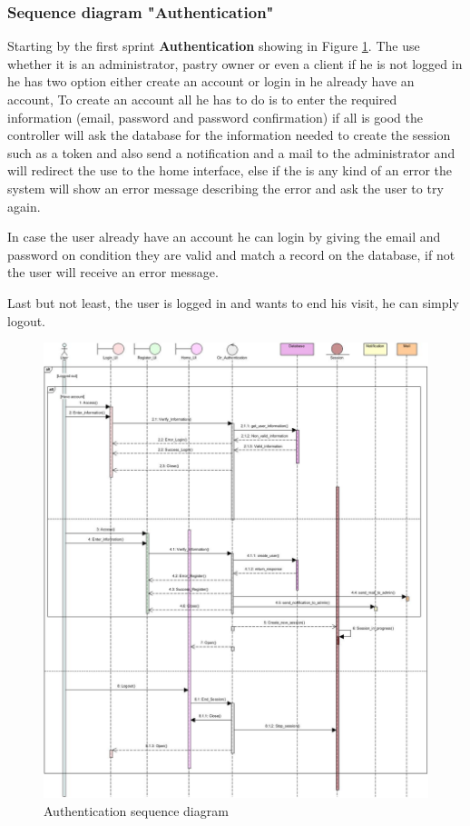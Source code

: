\documentclass[12pt,a4paper]{report}
\begin{document}
\subsubsection*{Sequence diagram "Authentication"}
Starting by the first sprint \textbf{Authentication} showing in Figure \ref{auth-sequence}. The use whether it is an administrator, pastry owner or even a client if he is not logged in he has two option either create an account or login in he already have an account, To create an account all he has to do is to enter the required information (email, password and password confirmation) if all is good the controller will ask the database for the information needed to create the session such as a token and also send a notification and a mail to the administrator and will redirect the use to the home interface, else if the is any kind of an error the system will show an error message describing the error and ask the user to try again.\par 
In case the user already have an account he can login by giving the email and password on condition they are valid and match a record on the database, if not the user will receive an error message.\par 
Last but not least, the user is logged in and wants to end his visit, he can simply logout.
\begin{figure}[H]
	\centering
	\includegraphics[width=7in,keepaspectratio]{authSequence.jpg}
	\caption{Authentication sequence diagram}
	\label{auth-sequence}
\end{figure}
\end{document}

